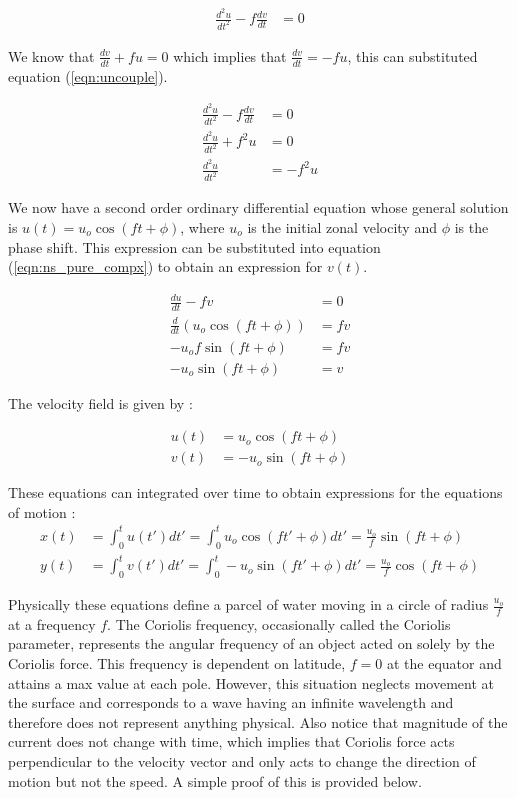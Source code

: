 \begin{align}
	\frac{d^2u}{dt^2}-f\frac{dv}{dt}&=0 \label{eqn:uncouple}
\end{align}

We know that $\frac{dv}{dt}+fu=0$ which implies that $\frac{dv}{dt}=-fu $, this can substituted equation (\ref{eqn:uncouple}). 

\begin{align}
	\frac{d^2u}{dt^2}-f\frac{dv}{dt}&=0 \\
	\frac{d^2u}{dt^2}+f^2u &=0 \\
	\frac{d^2u}{dt^2} &=-f^2u
\end{align}

We now have a second order ordinary differential equation whose general solution is $u(t)=u_o\cos(ft+\phi)$, where $u_o$ is the initial zonal velocity
and $\phi$ is the phase shift. This expression can be substituted into equation (\ref{eqn:ns_pure_compx}) to obtain an expression for $v(t)$. 

\begin{align}
	\frac{du}{dt}-fv&=0\\
	\frac{d}{dt}(u_o\cos(ft+\phi))&=fv\\
	-u_of\sin(ft+\phi) &=fv \\ 
	-u_o\sin(ft+\phi) &=v 
\end{align}

The velocity field is given by : 

\begin{align}
	u(t)&=u_o\cos(ft+\phi)\\
	v(t)&=-u_o\sin(ft+\phi)
\end{align}

These equations can integrated over time to obtain expressions for the equations of motion : 
\begin{align}
	x(t) &= \int_0^t u(t')dt' = \int_0^t u_o\cos(ft'+\phi) dt' = \frac{u_o}{f}\sin(ft+\phi) \\ 
	y(t) &= \int_0^t v(t')dt' = \int_0^t -u_o\sin(ft'+\phi) dt' = \frac{u_o}{f}\cos(ft+\phi)
\end{align} 

Physically these equations define a parcel of water moving in a circle of radius $\frac{u_o}{f}$ at a frequency $f$.  The Coriolis frequency, occasionally called the
Coriolis parameter, represents the angular frequency of an object acted on solely by the Coriolis force. This frequency is dependent on latitude, $f=0$ at the 
equator and attains a max value at each pole. However, this situation neglects movement at the surface and corresponds to a wave having an infinite wavelength and therefore does not represent anything physical. Also notice that magnitude of the current does not
change with time, which implies that Coriolis force acts perpendicular to the velocity vector and only acts to change the direction of motion but not the speed. A simple
proof of this is provided below.


